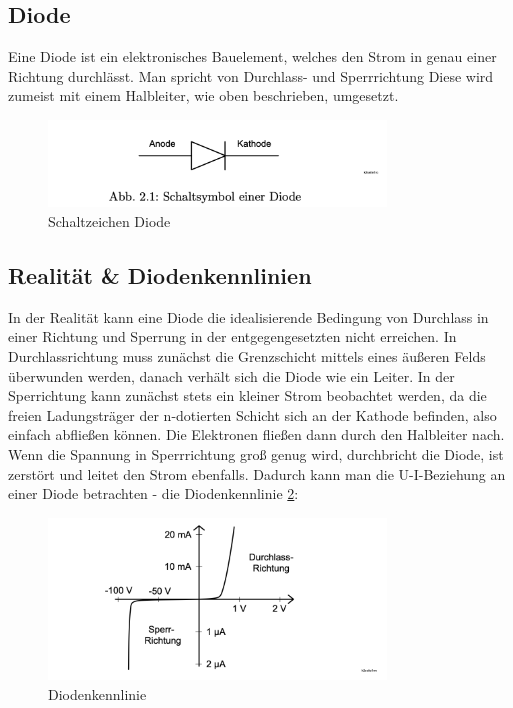 \documentclass{article}
\theoremstyle{definition}
\begin{document}
    \subsection{Diode}
    Eine Diode ist ein elektronisches Bauelement, welches den Strom in genau einer Richtung durchlässt. Man spricht von Durchlass- und Sperrrichtung Diese wird zumeist mit einem Halbleiter, wie oben beschrieben, umgesetzt.
    \begin{figure}[H]
        \centering
        \includegraphics[width=0.8\textwidth]{figs/fig2_1.png}
        \caption{Schaltzeichen Diode\cite{anleitung}}
        \label{fig:Abb2.1}
    \end{figure}

    \subsection{Realität \& Diodenkennlinien}
    In der Realität kann eine Diode die idealisierende Bedingung von Durchlass in einer Richtung und Sperrung in der entgegengesetzten nicht erreichen. In Durchlassrichtung muss zunächst die Grenzschicht mittels eines äußeren Felds überwunden werden, danach verhält sich die Diode wie ein Leiter. In der Sperrichtung kann zunächst stets ein kleiner Strom beobachtet werden, da die freien Ladungsträger der n-dotierten Schicht sich an der Kathode befinden, also einfach abfließen können. Die Elektronen fließen dann durch den Halbleiter nach. Wenn die Spannung in Sperrrichtung groß genug wird, durchbricht die Diode, ist zerstört und leitet den Strom ebenfalls. Dadurch kann man die U-I-Beziehung an einer Diode betrachten - die Diodenkennlinie \ref{fig:Abb2.2}:
    \begin{figure}[H]
        \centering
        \includegraphics[width=0.8\textwidth]{figs/fig2_2.png}
        \caption{Diodenkennlinie\cite{anleitung}}
        \label{fig:Abb2.2}
    \end{figure}
\end{document}
